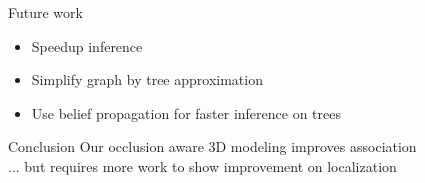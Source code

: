 \begin{frame}{Future work}
  \begin{itemize}
    \item Speedup inference
    \item Simplify graph by \cite{chow1968approximating} tree approximation
    \item Use belief propagation for faster inference on trees
  \end{itemize}
  
\end{frame}

\begin{frame}{Conclusion}
    Our occlusion aware 3D modeling improves association\\
    ... but requires more work to show improvement on localization
\end{frame}
